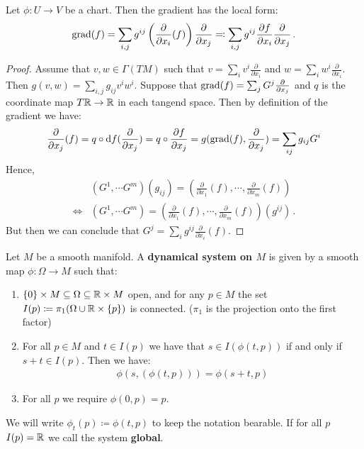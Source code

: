 \begin{lemma}
	Let $\phi:U\to V$ be a chart. Then the gradient has the local form:
	\begin{align*}
		\mathrm{grad}(f) =\sum_{i,j}g^{ij}  \left( \frac{\partial }{\partial x_i} (f) \right) \frac{\partial }{\partial x_j} \eqcolon \sum_{i,j}g^{ij} \frac{\partial f}{\partial x_i}  \frac{\partial }{\partial x_j} \, .
	\end{align*}
\end{lemma}
\begin{proof} Assume that $v,w\in \Gamma( TM)$ such that $v=\sum_i v^i\frac{\partial	}{\partial x_i}$ and $w=\sum_i w^i\frac{\partial	}{\partial x_i}$. Then  $g(v,w)=\sum_{i,j} g_{ij} v^i w^i$.
	Suppose that $\mathrm{grad}(f)=\sum_j G^j \frac{\partial}{\partial x_j}$ and $q$ is the coordinate map $T\mathbb{R}\to \mathbb{R}$ in each tangend space. Then by definition of the gradient we have:
	\begin{align*}
		\frac{\partial }{\partial x_j}(f)=	q \circ \mathop{}\!\mathrm{d} f (\frac{\partial }{\partial x_j})=q\circ \frac{\partial f}{\partial x_j}= g(\mathrm{grad}(f),\frac{\partial }{\partial x_j})= \sum_{ij}g_{ij} G^i
	\end{align*} Hence, 
	\begin{align*}
		&(G^1,\cdots G^m)(g_{ij})=\left(\frac{\partial }{\partial x_1} (f),\cdots,\frac{\partial }{\partial x_m} (f)  \right) \\
		\Leftrightarrow &(G^1,\cdots G^m)=\left(\frac{\partial }{\partial x_1} (f),\cdots,\frac{\partial }{\partial x_m} (f)  \right) (g^{ij})\, .
	\end{align*}  But then we can conclude that $G^j=\sum_i g^{ij}\frac{\partial }{\partial x_i} (f)$.
	
\end{proof}
\begin{definition}
	Let $M$ be a smooth manifold. A \textbf{dynamical system on $M$} is given by a smooth map $\phi:\Omega \to M$ such that:
	\begin{enumerate}
		\item $\{0\}\times M \subseteq \Omega \subseteq \mathbb{R} \times M$ open, and for any $p\in M$ the set $I(p)\coloneq \pi_1(\Omega\cup \mathbb{R}\times \{p\})$ is connected. ($\pi_1$ is the projection onto the first factor)
		\item For all $p\in M$ and $t\in I(p)$ we have that $s\in I(\phi(t,p))$ if and only if $s+t\in I(p)$. Then we have:
		\begin{align*}
			\phi(s,(\phi(t,p)))=\phi(s+t,p)
		\end{align*} 
		\item For all $p$ we require $\phi(0,p)=p$. 
	\end{enumerate}
	We will write $\phi_t(p)\coloneq \phi(t,p)$ to keep the notation bearable. 
	If for all $p$ $I(p)=\mathbb{R}$ we call the system \textbf{global}. 
\end{definition}

